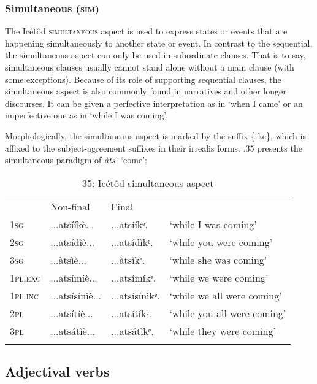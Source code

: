 \subsubsection{Simultaneous (\textsc{sim})}

The Icétôd \textsc{simultaneous} aspect is used to express states or events that are happening simultaneously to another state or event. In contrast to the sequential, the simultaneous aspect can only be used in subordinate clauses. That is to say, simultaneous clauses usually cannot stand alone without a main clause (with some exceptions). Because of its role of supporting sequential clauses, the simultaneous aspect is also commonly found in narratives and other longer discourses. It can be given a perfective interpretation as in ‘when I came’ or an imperfective one as in ‘while I was coming’.

Morphologically, the simultaneous aspect is marked by the suffix \{-ke\}, which is affixed to the subject-agreement suffixes in their irrealis forms. .35 presents the simultaneous paradigm of \textit{àts-} ‘come’:


\begin{table}
\caption{35: Icétôd simultaneous aspect}
\label{tab:8}


\begin{tabularx}{\textwidth}{XXXX} & Non-final & Final & \\
\lsptoprule
\textsc{1sg} & ...atsííkè... & ...atsííkᵉ. & ‘while I was coming’\\
\textsc{2sg} & ...atsídìè... & ...atsídìkᵉ. & ‘while you were coming’\\
\textsc{3sg} & ...àtsìè... & ...àtsìkᵉ. & ‘while she was coming’\\
\textsc{1pl.exc} & ...atsímíè... & ...atsímíkᵉ. & ‘while we were coming’\\
\textsc{1pl.inc} & ...atsísínìè... & ...atsísínìkᵉ. & ‘while we all were coming’\\
\textsc{2pl} & ...atsítíè... & ...atsítíkᵉ. & ‘while you all were coming’\\
\textsc{3pl} & ...atsátìè... & ...atsátìkᵉ. & ‘while they were coming’\\
\lspbottomrule
\end{tabularx}
\end{table}



\subsection{Adjectival verbs}
